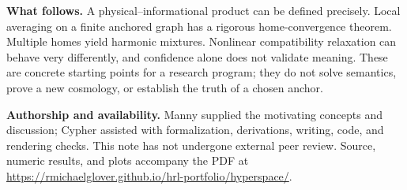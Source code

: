 \documentclass[12pt]{article}
\begin{document}
\textbf{What follows.} A physical--informational product can be defined precisely. Local averaging on a finite anchored graph has a rigorous home-convergence theorem. Multiple homes yield harmonic mixtures. Nonlinear compatibility relaxation can behave very differently, and confidence alone does not validate meaning. These are concrete starting points for a research program; they do not solve semantics, prove a new cosmology, or establish the truth of a chosen anchor.

\textbf{Authorship and availability.} Manny supplied the motivating concepts and discussion; Cypher assisted with formalization, derivations, writing, code, and rendering checks. This note has not undergone external peer review. Source, numeric results, and plots accompany the PDF at \url{https://rmichaelglover.github.io/hrl-portfolio/hyperspace/}.
\end{document}
